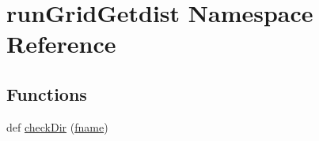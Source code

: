 \hypertarget{namespacerunGridGetdist}{}\section{run\+Grid\+Getdist Namespace Reference}
\label{namespacerunGridGetdist}
\subsection*{Functions}
\begin{DoxyCompactItemize}
\item 
def \mbox{\hyperlink{namespacerunGridGetdist_a7ba1f97b655387533e6ce36767ef8e8f}{check\+Dir}} (\mbox{\hyperlink{namespacerunGridGetdist_aa70fea69807ee2a64c74791e8994967e}{fname}})
\end{DoxyCompactItemize}
